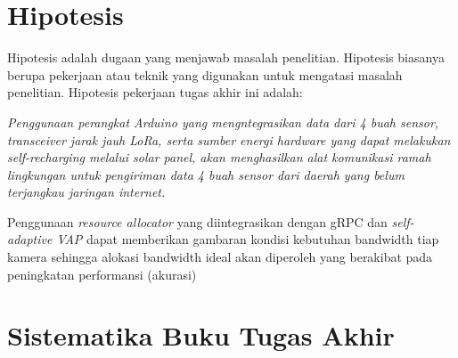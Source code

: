 \section{Hipotesis}

Hipotesis adalah dugaan yang menjawab masalah penelitian. Hipotesis biasanya berupa pekerjaan atau teknik yang digunakan untuk mengatasi masalah penelitian. 
Hipotesis pekerjaan tugas akhir ini adalah:

\textit{Penggunaan perangkat Arduino yang mengntegrasikan data dari 4 buah sensor, transceiver jarak jauh LoRa, serta sumber energi hardware yang dapat melakukan self-recharging melalui solar panel, akan menghasilkan alat komunikasi ramah lingkungan untuk pengiriman data 4 buah sensor dari daerah yang belum terjangkau jaringan internet.}

Penggunaan \textit{resource allocator} yang diintegrasikan dengan gRPC dan \textit{self-adaptive VAP} dapat memberikan gambaran kondisi kebutuhan bandwidth
tiap kamera sehingga alokasi bandwidth ideal akan diperoleh yang berakibat pada peningkatan performansi (akurasi)

\section{Sistematika Buku Tugas Akhir}




